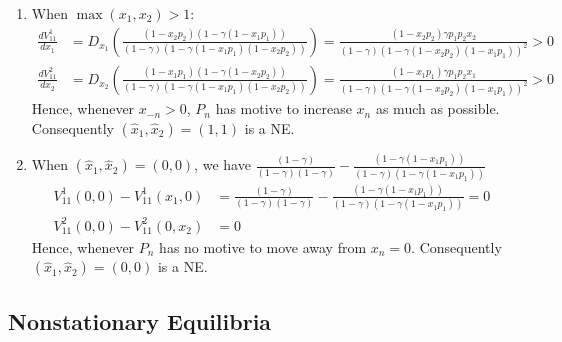 \documentclass{article}%
\numberwithin{equation}{section}
\begin{document}
\begin{enumerate}
\item When $\max\left(  x_{1},x_{2}\right)  >1$:%
\begin{align*}
\frac{dV_{11}^{1}}{dx_{1}}  &  =D_{x_{1}}\left(  \frac{\left(  1-x_{2}%
p_{2}\right)  \left(  1-\gamma\left(  1-x_{1}p_{1}\right)  \right)  }{\left(
1-\gamma\right)  \left(  1-\gamma\left(  1-x_{1}p_{1}\right)  \left(
1-x_{2}p_{2}\right)  \right)  }\right)  =\allowbreak\frac{\left(  1-x_{2}%
p_{2}\right)  \gamma p_{1}p_{2}x_{2}}{\left(  1-\gamma\right)  \left(
1-\gamma\left(  1-x_{2}p_{2}\right)  \left(  1-x_{1}p_{1}\right)  \right)
^{2}}\allowbreak>0\\
\frac{dV_{11}^{2}}{dx_{2}}  &  =D_{x_{2}}\left(  \frac{\left(  1-x_{1}%
p_{1}\right)  \left(  1-\gamma\left(  1-x_{2}p_{2}\right)  \right)  }{\left(
1-\gamma\right)  \left(  1-\gamma\left(  1-x_{1}p_{1}\right)  \left(
1-x_{2}p_{2}\right)  \right)  }\right)  =\allowbreak\frac{\left(  1-x_{1}%
p_{1}\right)  \gamma p_{1}p_{2}x_{1}}{\left(  1-\gamma\right)  \left(
1-\gamma\left(  1-x_{2}p_{2}\right)  \left(  1-x_{1}p_{1}\right)  \right)
^{2}}\allowbreak>0
\end{align*}
Hence, whenever $x_{-n}>0$, $P_{n}$ has motive to increase $x_{n}$ as much as
possible. Consequently $\left(  \widehat{x}_{1},\widehat{x}_{2}\right)
=\left(  1,1\right)  $ is a NE.

\item When $\left(  \widehat{x}_{1},\widehat{x}_{2}\right)  =\left(
0,0\right)  $, we have $\frac{\left(  1-\gamma\right)  }{\left(
1-\gamma\right)  \left(  1-\gamma\right)  }-\frac{\left(  1-\gamma\left(
1-x_{1}p_{1}\right)  \right)  }{\left(  1-\gamma\right)  \left(
1-\gamma\left(  1-x_{1}p_{1}\right)  \right)  }$%
\begin{align*}
V_{11}^{1}\left(  0,0\right)  -V_{11}^{1}\left(  x_{1},0\right)   &
=\frac{\left(  1-\gamma\right)  }{\left(  1-\gamma\right)  \left(
1-\gamma\right)  }-\frac{\left(  1-\gamma\left(  1-x_{1}p_{1}\right)  \right)
}{\left(  1-\gamma\right)  \left(  1-\gamma\left(  1-x_{1}p_{1}\right)
\right)  }=0\\
V_{11}^{2}\left(  0,0\right)  -V_{11}^{2}\left(  0,x_{2}\right)   &  =0
\end{align*}
Hence, whenever $P_{n}$ has no motive to move away from $x_{n}=0$.
Consequently $\left(  \widehat{x}_{1},\widehat{x}_{2}\right)  =\left(
0,0\right)  $ is a NE.
\end{enumerate}

\subsection{Nonstationary Equilibria}
\end{document}
